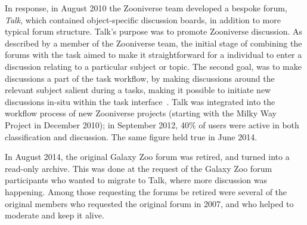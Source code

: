 \documentclass{sigchi}
\begin{document}
\begin{spacing}{0.97}
In response, in August 2010 the Zooniverse team developed a bespoke forum, \emph{Talk}, which contained object-specific discussion boards, in addition to more typical forum structure. Talk's purpose was to promote Zooniverse discussion. As described by a member of the Zooniverse team, the initial stage of combining the forums with the task aimed to make it straightforward for a individual to enter a discussion relating to a particular subject or topic. The second goal, was to make discussions a part of the task workflow, by making discussions around the relevant subject salient during a tasks, making it possible to initiate new discussions in-situ within the task interface~\cite{norman2002design}. 
Talk was integrated into the workflow process of new Zooniverse projects (starting with the Milky Way Project in December 2010);
in September 2012, 40\% of users were active in both classification and discussion. The same figure held true in June 2014.

In August 2014, the original Galaxy Zoo forum was retired, and turned into a read-only archive. This was done at the request of the Galaxy Zoo forum participants who wanted to migrate to Talk, where more discussion was happening. Among those requesting the forums be retired were several of the original members who requested the original forum in 2007, and who helped to moderate and keep it alive.




\end{spacing}
\end{document}
